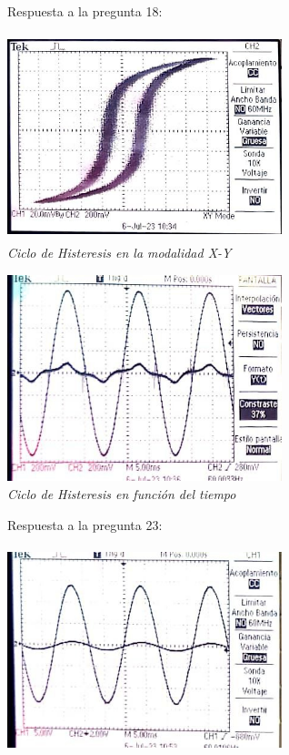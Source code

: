 \documentclass[12pt]{article}
\begin{document}
	Respuesta a la pregunta 18:
	\begin{center}
		\includegraphics[width=8cm,height=6cm]{Img/figura1}\\
		\textit{Ciclo de Histeresis en la modalidad X-Y}
		
		\vspace{1cm}
		\includegraphics[width=8cm,height=6cm]{Img/figura2}\\
		\textit{Ciclo de Histeresis en función del tiempo}
		
		\vspace{1cm}
	\end{center}

	Respuesta a la pregunta 23:
	\begin{center}
		\includegraphics[width=8cm,height=6cm]{Img/figura3}\\
	\end{center}
\end{document}
